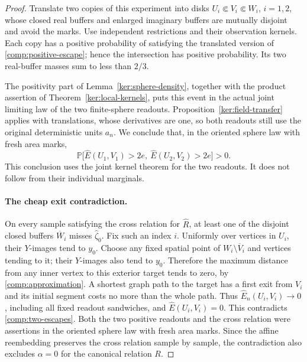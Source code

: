 \documentclass[11pt]{article}
\numberwithin{equation}{section}
\theoremstyle{definition}
\theoremstyle{remark}
\newcommand{\PP}{\mathbb P}
\newcommand{\1}{\mathbf 1}
\begin{document}
\begin{proof}
Translate two copies of this experiment into disks
$U_i\Subset V_i\Subset W_i$, $i=1,2$, whose closed real buffers
and enlarged imaginary buffers are mutually disjoint and avoid
the marks.  Use independent restrictions and their observation
kernels.  Each copy has a positive probability of satisfying the
translated version of \eqref{comp:positive-escape}; hence the
intersection has positive probability.  Its two real-buffer
masses sum to less than $2/3$.

The positivity part of Lemma~\ref{ker:sphere-density}, together
with the product assertion of Theorem~\ref{ker:local-kernels},
puts this event in the actual joint limiting law of the two
finite-sphere readouts.  Proposition~\ref{ker:field-transfer} applies
with translations, whose derivatives are one, so both readouts
still use the original deterministic units $a_n$.  We conclude
that, in the oriented sphere law with fresh area marks,
\begin{equation}
 \label{comp:two-escapes}
 \PP\bigl[\widehat E(U_1,V_1)>2e,\
          \widehat E(U_2,V_2)>2e\bigr]>0.
\end{equation}
This conclusion uses the joint kernel theorem for the two
readouts.  It does not follow from their individual marginals.

\paragraph{The cheap exit contradiction.}
On every sample satisfying the cross relation for $\widehat R$,
at least one of the disjoint closed buffers $\overline W_i$
misses $\widehat\zeta_0$.  Fix
such an index $i$.  Uniformly over vertices in $U_i$, their
$Y$-images tend to $y_0$.  Choose any fixed spatial point of
$W_i\setminus\overline V_i$ and vertices tending to it; their
$Y$-images also tend to $y_0$.  Therefore the maximum distance
from any inner vertex to this exterior target tends to zero,
by \eqref{comp:approximation}.  A shortest graph path to the
target has a first exit from $V_i$ and its initial segment costs
no more than the whole path.  Thus
$\widehat E_n(U_i,V_i)\to0$, including all fixed readout sandwiches,
and $\widehat E(U_i,V_i)=0$.  This contradicts
\eqref{comp:two-escapes}.  Both the two positive readouts and the
cross relation were assertions in the oriented sphere law with
fresh area marks.  Since the affine reembedding preserves the
cross relation sample by sample, the contradiction also excludes
$\alpha=0$ for the canonical relation $R$.
\end{proof}
\end{document}
